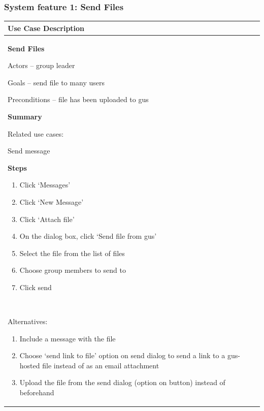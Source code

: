 \documentclass[letterpaper]{article}
\newcommand\liststyleLi{%
\renewcommand\theenumi{\arabic{enumi}}
\renewcommand\theenumii{\alph{enumii}}
\renewcommand\theenumiii{\roman{enumiii}}
\renewcommand\theenumiv{\arabic{enumiv}}
\renewcommand\labelenumi{\theenumi.}
\renewcommand\labelenumii{\theenumii.}
\renewcommand\labelenumiii{\theenumiii.}
\renewcommand\labelenumiv{\theenumiv.}
}
\newcommand\liststyleLii{%
\renewcommand\theenumi{\arabic{enumi}}
\renewcommand\theenumii{\alph{enumii}}
\renewcommand\theenumiii{\roman{enumiii}}
\renewcommand\theenumiv{\arabic{enumiv}}
\renewcommand\labelenumi{\theenumi.}
\renewcommand\labelenumii{\theenumii.}
\renewcommand\labelenumiii{\theenumiii.}
\renewcommand\labelenumiv{\theenumiv.}
}
\begin{document}
\subsubsection[System feature 1: Send Files]{\rmfamily System feature 1:
Send Files}
\begin{flushleft}
\tablehead{}
\begin{supertabular}{|m{6.42126in}|}
\hline
\bfseries\color{black} Use Case Description\\\hline
{\bfseries\color{black} Send Files}

{\color{black} Actors -- group leader }

{\color{black} Goals -- send file to many users}

{\color{black} Preconditions -- file has been uploaded to gus}

{\bfseries\color{black} Summary}

{\color{black} Related use cases:}

{\color{black} Send message}

{\bfseries\color{black} Steps}

\liststyleLi
\begin{enumerate}
\item \color{black} Click {\textquoteleft}Messages{\textquoteright}\item
\color{black} Click {\textquoteleft}New Message{\textquoteright}\item
\color{black} Click {\textquoteleft}Attach file{\textquoteright}\item
\color{black} On the dialog box, click {\textquoteleft}Send file from
gus{\textquoteright}\item \color{black} Select the file from the list
of files\item \color{black} Choose group members to send to\item
\color{black} Click send\end{enumerate}
~

{\color{black} Alternatives:}

\liststyleLii
\begin{enumerate}
\item \color{black} Include a message with the file\item \color{black}
Choose {\textquoteleft}send link to file{\textquoteright} option on
send dialog to send a link to a gus-hosted file instead of as an email
attachment\item \color{black} Upload the file from the send dialog
(option on button) instead of beforehand\end{enumerate}
\\\hline
\end{supertabular}
\end{flushleft}
\end{document}
